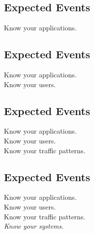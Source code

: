 \documentclass[xga]{xdvislides}
\begin{document}
\subsection{Expected Events}
\vspace*{\fill}
\Huge
\begin{center}
Know your applications.
\end{center}
\Normalsize
\vspace*{\fill}

\subsection{Expected Events}
\vspace*{\fill}
\Huge
\begin{center}
Know your applications. \\
\vspace{.4in}
Know your users.
\end{center}
\Normalsize
\vspace*{\fill}

\subsection{Expected Events}
\vspace*{\fill}
\Huge
\begin{center}
Know your applications. \\
\vspace{.4in}
Know your users. \\
\vspace{.4in}
Know your traffic patterns.
\end{center}
\Normalsize
\vspace*{\fill}

\subsection{Expected Events}
\vspace*{\fill}
\Huge
\begin{center}
Know your applications. \\
\vspace{.4in}
Know your users. \\
\vspace{.4in}
Know your traffic patterns. \\
\vspace{.4in}
{\em Know your systems.}
\end{center}
\Normalsize
\vspace*{\fill}
\end{document}
